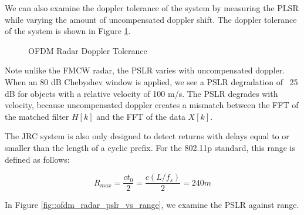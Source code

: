 \documentclass[conference]{IEEEtran}
\begin{document}

We can also examine the doppler tolerance of the system by measuring the PLSR while varying the amount of uncompensated doppler shift. The doppler tolerance of the system is shown in Figure \ref{fig::ofdm_radar_doppler_tolerance}.

\begin{figure}[H]
\centering
{}
\caption{OFDM Radar Doppler Tolerance}
\label{fig::ofdm_radar_doppler_tolerance}
\end{figure}

Note unlike the FMCW radar, the PSLR varies with uncompensated doppler. When an 80 dB Chebyshev window is applied, we see a PSLR degradation of ~25 dB for objects with a relative velocity of 100 m/s. The PSLR degrades with velocity, because uncompensated doppler creates a mismatch between the FFT of the matched filter $H[k]$ and the FFT of the data $X[k]$.

The JRC system is also only designed to detect returns with delays equal to or smaller than the length of a cyclic prefix. For the 802.11p standard, this range is defined as follows:

\begin{equation}
R_{max} = \frac{ct_0}{2} = \frac{c(L/f_s)}{2} = 240 m
\end{equation}

In Figure \ref{fig::ofdm_radar_pslr_vs_range}, we examine the PSLR against range.
\end{document}
